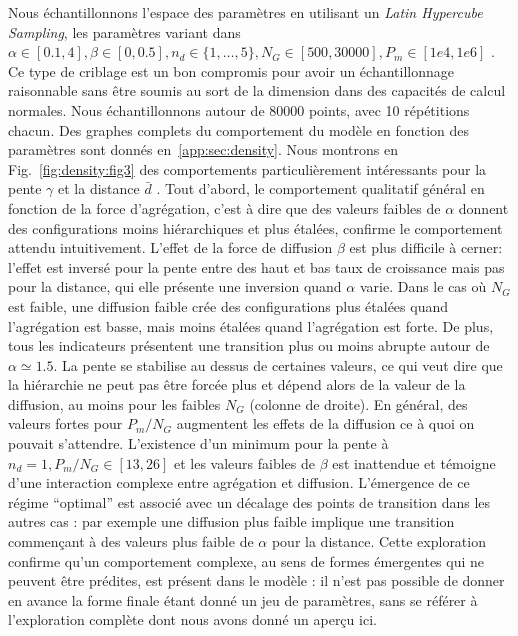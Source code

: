 {Nous échantillonnons l'espace des paramètres en utilisant un \emph{Latin Hypercube Sampling}, les paramètres variant dans $\alpha \in [0.1,4],\beta \in [0,0.5],n_d \in \{1,\ldots , 5\}, N_G \in [500,30000], P_m \in [1e4,1e6]$ . Ce type de criblage est un bon compromis pour avoir un échantillonnage raisonnable sans être soumis au sort de la dimension dans des capacités de calcul normales. Nous échantillonnons autour de 80000 points, avec 10 répétitions chacun. Des graphes complets du comportement du modèle en fonction des paramètres sont donnés en~\ref{app:sec:density}. Nous montrons en Fig.~\ref{fig:density:fig3} des comportements particulièrement intéressants pour la pente $\gamma$ et la distance $\bar{d}$ . Tout d'abord, le comportement qualitatif général en fonction de la force d'agrégation, c'est à dire que des valeurs faibles de $\alpha$ donnent des configurations moins hiérarchiques et plus étalées, confirme le comportement attendu intuitivement. L'effet de la force de diffusion $\beta$ est plus difficile à cerner: l'effet est inversé pour la pente entre des haut et bas taux de croissance mais pas pour la distance, qui elle présente une inversion quand $\alpha$ varie. Dans le cas où $N_G$ est faible, une diffusion faible crée des configurations plus étalées quand l'agrégation est basse, mais moins étalées quand l'agrégation est forte. De plus, tous les indicateurs présentent une transition plus ou moins abrupte autour de $\alpha \simeq 1.5$. La pente se stabilise au dessus de certaines valeurs, ce qui veut dire que la hiérarchie ne peut pas être forcée plus et dépend alors de la valeur de la diffusion, au moins pour les faibles $N_G$ (colonne de droite). En général, des valeurs fortes pour $P_m/N_G$ augmentent les effets de la diffusion ce à quoi on pouvait s'attendre. L'existence d'un minimum pour la pente à $n_d=1,P_m/N_G\in\left[13,26\right]$ et les valeurs faibles de $\beta$ est inattendue et témoigne d'une interaction complexe entre agrégation et diffusion. L'émergence de ce régime ``optimal'' est associé avec un décalage des points de transition dans les autres cas : par exemple une diffusion plus faible implique une transition commençant à des valeurs plus faible de $\alpha$ pour la distance. Cette exploration confirme qu'un comportement complexe, au sens de formes émergentes qui ne peuvent être prédites, est présent dans le modèle : il n'est pas possible de donner en avance la forme finale étant donné un jeu de paramètres, sans se référer à l'exploration complète dont nous avons donné un aperçu ici.
}



